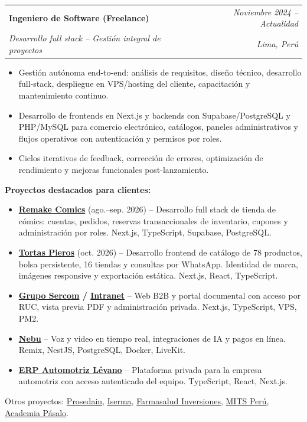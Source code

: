 \documentclass[a4paper,10pt]{article}
\makeatletter
\newcommand{\cvsubheading}[4]{
  \vspace{2pt}
  \begin{tabularx}{\textwidth}{@{}X r@{}}
    \textbf{#1} & \textit{\small #2} \\
    \textit{\small\color{graytext} #3} & \textit{\small\color{graytext} #4} \\
  \end{tabularx}\vspace{-2pt}
}
\makeatother
\begin{document}
\cvsubheading
  {Ingeniero de Software (Freelance)}{Noviembre 2024 -- Actualidad}
  {Desarrollo full stack -- Gesti\'on integral de proyectos}{Lima, Per\'u}

\begin{itemize}[leftmargin=16pt, itemsep=1.5pt, parsep=0pt, topsep=3pt]
  \item Gesti\'on aut\'onoma end-to-end: an\'alisis de requisitos, dise\~no t\'ecnico, desarrollo full-stack, despliegue en VPS/hosting del cliente, capacitaci\'on y mantenimiento continuo.
  \item Desarrollo de frontends en Next.js y backends con Supabase/PostgreSQL y PHP/MySQL para comercio electrónico, catálogos, paneles administrativos y flujos operativos con autenticación y permisos por roles.
  \item Ciclos iterativos de feedback, correcci\'on de errores, optimizaci\'on de rendimiento y mejoras funcionales post-lanzamiento.
\end{itemize}

\vspace{2pt}
{\small\textbf{Proyectos destacados para clientes:}}
\begin{itemize}[leftmargin=16pt, itemsep=1.5pt, parsep=0pt, topsep=2pt]
  \item \textbf{\href{https://remake.johanamador.com/}{Remake Comics}} (ago.--sep. 2026) -- Desarrollo full stack de tienda de cómics: cuentas, pedidos, reservas transaccionales de inventario, cupones y administración por roles. Next.js, TypeScript, Supabase, PostgreSQL.
  \item \textbf{\href{https://pieros.johanamador.com/}{Tortas Pieros}} (oct. 2026) -- Desarrollo frontend de catálogo de 78 productos, bolsa persistente, 16 tiendas y consultas por WhatsApp. Identidad de marca, imágenes responsive y exportación estática. Next.js, React, TypeScript.
  \item \textbf{\href{https://gruposercom.pe}{Grupo Sercom} / \href{https://intranet.gruposercom.pe}{Intranet}} -- Web B2B y portal documental con acceso por RUC, vista previa PDF y administración privada. Next.js, TypeScript, VPS, PM2.
  \item \textbf{\href{https://flow-telligence.com}{Nebu}} -- Voz y video en tiempo real, integraciones de IA y pagos en línea. Remix, NestJS, PostgreSQL, Docker, LiveKit.
  \item \textbf{\href{https://mecanicalevano.org}{ERP Automotriz Lévano}} -- Plataforma privada para la empresa automotriz con acceso autenticado del equipo. TypeScript, React, Next.js.
\end{itemize}
{\small\color{graytext} Otros proyectos: \href{https://prosedain.com}{Prosedain}, \href{https://www.isermaperu.com}{Iserma}, \href{https://farmasaludinversiones.com}{Farmasalud Inversiones}, \href{https://mitsperu.com}{MITS Perú}, \href{https://academiapasalo.com}{Academia Pásalo}.}
\end{document}
